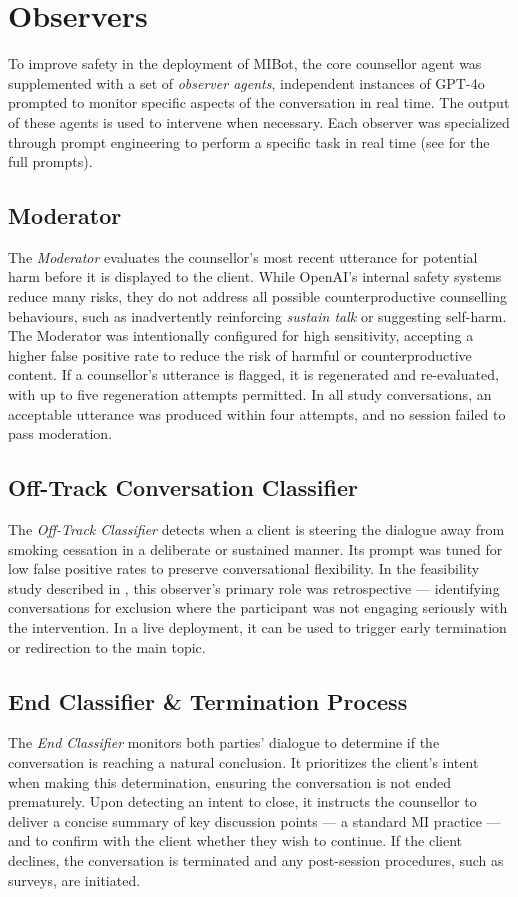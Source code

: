 \section{Observers}
\label{sec:observers}
To improve safety in the deployment of MIBot, the core counsellor agent was supplemented with a set of \textit{observer agents}, independent instances of GPT-4o prompted to monitor specific aspects of the conversation in real time. The output of these agents is used to intervene when necessary. Each observer was specialized through prompt engineering to perform a specific task in real time (see  for the full prompts).

\subsection{Moderator}
The \textit{Moderator} evaluates the counsellor's most recent utterance for potential harm before it is displayed to the client. While OpenAI's internal safety systems reduce many risks, they do not address all possible counterproductive counselling behaviours, such as inadvertently reinforcing \emph{sustain talk} or suggesting self-harm. The Moderator was intentionally configured for high sensitivity, accepting a higher false positive rate to reduce the risk of harmful or counterproductive content. If a counsellor's utterance is flagged, it is regenerated and re-evaluated, with up to five regeneration attempts permitted. In all study conversations, an acceptable utterance was produced within four attempts, and no session failed to pass moderation.

\subsection{Off-Track Conversation Classifier}
The \textit{Off-Track Classifier} detects when a client is steering the dialogue away from smoking cessation in a deliberate or sustained manner. Its prompt was tuned for low false positive rates to preserve conversational flexibility. In the feasibility study described in , this observer's primary role was retrospective --- identifying conversations for exclusion where the participant was not engaging seriously with the intervention. In a live deployment, it can be used to trigger early termination or redirection to the main topic.

\subsection{End Classifier \& Termination Process}
The \textit{End Classifier} monitors both parties' dialogue to determine if the conversation is reaching a natural conclusion. It prioritizes the client's intent when making this determination, ensuring the conversation is not ended prematurely. Upon detecting an intent to close, it instructs the counsellor to deliver a concise summary of key discussion points --- a standard MI practice --- and to confirm with the client whether they wish to continue. If the client declines, the conversation is terminated and any post-session procedures, such as surveys, are initiated.


